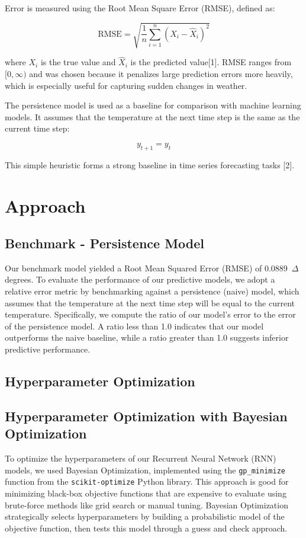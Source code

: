 \documentclass[11pt]{article}
\begin{document}
Error is measured using the Root Mean Square Error (RMSE), defined as:

\[
\text{RMSE} = \sqrt{\frac{1}{n} \sum_{i=1}^{n}(X_i - \hat{X}_i)^2}
\]

where \( X_i \) is the true value and \( \hat{X}_i \) is the predicted value[1]. RMSE ranges from \([0, \infty)\) and was chosen because it penalizes large prediction errors more heavily, which is especially useful for capturing sudden changes in weather.

The persistence model is used as a baseline for comparison with machine learning models. It assumes that the temperature at the next time step is the same as the current time step:

\[
y_{t+1} = y_t
\]

This simple heuristic forms a strong baseline in time series forecasting tasks [2].

\section*{Approach}

\subsection*{Benchmark - Persistence Model}

Our benchmark model yielded a Root Mean Squared Error (RMSE) of 0.0889~$\Delta$degrees. To evaluate the performance of our predictive models, we adopt a relative error metric by benchmarking against a persistence (naive) model, which assumes that the temperature at the next time step will be equal to the current temperature. Specifically, we compute the ratio of our model's error to the error of the persistence model. A ratio less than 1.0 indicates that our model outperforms the naive baseline, while a ratio greater than 1.0 suggests inferior predictive performance.

\subsection*{Hyperparameter Optimization}
\subsection{Hyperparameter Optimization with Bayesian Optimization}

To optimize the hyperparameters of our Recurrent Neural Network (RNN) models, we used Bayesian Optimization, implemented using the \texttt{gp\_minimize} function from the \texttt{scikit-optimize} Python library. This approach is good for minimizing black-box objective functions that are expensive to evaluate using brute-force methods like grid search or manual tuning. Bayesian Optimization strategically selects hyperparameters by building a probabilistic model of the objective function, then tests this model through a guess and check approach.
\end{document}

